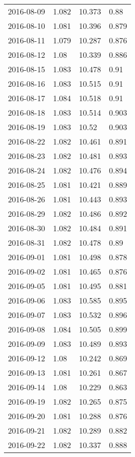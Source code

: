 \begin{center}
\begin{longtable}{r lll}
    2016-08-09 & 1.082  & 10.373 & 0.88   \\
    2016-08-10 & 1.081  & 10.396 & 0.879  \\
    2016-08-11 & 1.079  & 10.287 & 0.876  \\
    2016-08-12 & 1.08   & 10.339 & 0.886  \\
    2016-08-15 & 1.083  & 10.478 & 0.91   \\
    2016-08-16 & 1.083  & 10.515 & 0.91   \\
    2016-08-17 & 1.084  & 10.518 & 0.91   \\
    2016-08-18 & 1.083  & 10.514 & 0.903  \\
    2016-08-19 & 1.083  & 10.52  & 0.903  \\
    2016-08-22 & 1.082  & 10.461 & 0.891  \\
    2016-08-23 & 1.082  & 10.481 & 0.893  \\
    2016-08-24 & 1.082  & 10.476 & 0.894  \\
    2016-08-25 & 1.081  & 10.421 & 0.889  \\
    2016-08-26 & 1.081  & 10.443 & 0.893  \\
    2016-08-29 & 1.082  & 10.486 & 0.892  \\
    2016-08-30 & 1.082  & 10.484 & 0.891  \\
    2016-08-31 & 1.082  & 10.478 & 0.89   \\
    2016-09-01 & 1.081  & 10.498 & 0.878  \\
    2016-09-02 & 1.081  & 10.465 & 0.876  \\
    2016-09-05 & 1.081  & 10.495 & 0.881  \\
    2016-09-06 & 1.083  & 10.585 & 0.895  \\
    2016-09-07 & 1.083  & 10.532 & 0.896  \\
    2016-09-08 & 1.084  & 10.505 & 0.899  \\
    2016-09-09 & 1.083  & 10.489 & 0.893  \\
    2016-09-12 & 1.08   & 10.242 & 0.869  \\
    2016-09-13 & 1.081  & 10.261 & 0.867  \\
    2016-09-14 & 1.08   & 10.229 & 0.863  \\
    2016-09-19 & 1.082  & 10.265 & 0.875  \\
    2016-09-20 & 1.081  & 10.288 & 0.876  \\
    2016-09-21 & 1.082  & 10.289 & 0.882  \\
    2016-09-22 & 1.082  & 10.337 & 0.888  \\

\end{longtable}
\end{center}
